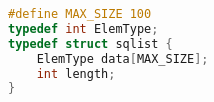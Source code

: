\begin{lstlisting}[title=顺序存储的结构代码,language=C,frame=tb,backgroundcolor=\color{red!10}]
#define MAX_SIZE 100
typedef int ElemType;
typedef struct sqlist {
    ElemType data[MAX_SIZE];
    int length;
}
\end{lstlisting}
